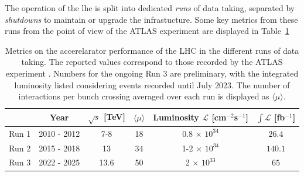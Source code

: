 The operation of the \gls{lhc} is split into dedicated \textit{runs} of data taking, separated by \textit{shutdowns} to maintain or upgrade the infrastucture. Some key metrics from these runs from the point of view of the ATLAS experiment are displayed in Table~\ref{tbl:LHCATLASperf}
\begin{table}[!htbp]
    \begin{center}
        \renewcommand{\arraystretch}{1.2}
        \begin{tabular}{cc|cccc} \hline \hline 
          & Year & $\sqrt{s}$ [TeV] & $\langle \mu \rangle$ &  Luminosity $\mathcal{L}$ [cm$^{-2}$s$^{-1}$] & $\int\mathcal{L}$ [fb$^{-1}$] \\ \hline
          Run 1 & 2010 - 2012 & 7-8    & 18 & 0.8 $\times$ $10^{34}$    & $26.4$ \\
          Run 2 & 2015 - 2018 & 13     & 34 & 1-2 $\times$ $10^{34}$  & $140.1$ \\
          Run 3 & 2022 - 2025 & 13.6     & 50 & 2 $\times$ $10^{33}$    & $65$ \\

          \hline\hline
        \end{tabular}
      \caption{Metrics on the accerelarator performance of the LHC in the different runs of data taking. The reported values correspond to those recorded by the ATLAS experiment \cite{ATLAS:run1Lumi, ATLAS:2022hro, ATL-DAPR-PUB-2023-001}. Numbers for the ongoing Run 3 are preliminary, with the integrated luminosity listed considering events recorded until July 2023. The number of interactions per bunch crossing averaged over each run is displayed as $\langle \mu \rangle$.} %
      \label{tbl:LHCATLASperf}
    \end{center}
\end{table}

